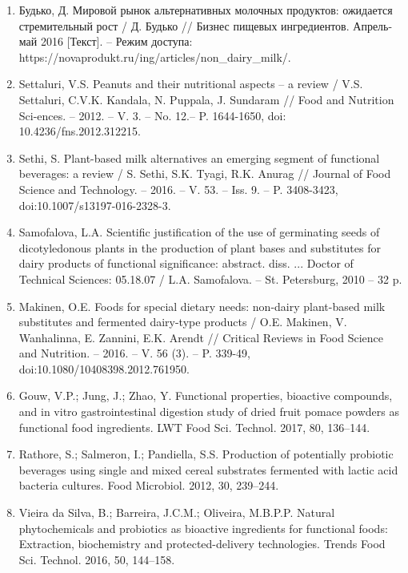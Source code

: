 \begin{enumerate}
\item
Будько, Д. Мировой рынок альтернативных молочных продуктов: ожидается
стремительный рост / Д. Будько // Бизнес пищевых ингредиентов.
Апрель-май 2016 {[}Текст{]}. -- Режим доступа:
https://novaprodukt.ru/ing/articles/non\_dairy\_milk/.

\item
Settaluri, V.S. Peanuts and their nutritional aspects -- a review /
V.S. Settaluri, C.V.K. Kandala, N. Puppala, J. Sundaram // Food and
Nutrition Sci-ences. -- 2012. -- V. 3. -- No. 12.-- P. 1644-1650, doi:
10.4236/fns.2012.312215.

\item
Sethi, S. Plant-based milk alternatives an emerging segment of
functional beverages: a review / S. Sethi, S.K. Tyagi, R.K. Anurag //
Journal of Food Science and Technology. -- 2016. -- V. 53. -- Iss. 9. --
P. 3408-3423, doi:10.1007/s13197-016-2328-3.

\item
Samofalova, L.A. Scientific justification of the use of germinating
seeds of dicotyledonous plants in the production of plant bases and
substitutes for dairy products of functional significance: abstract.
diss. ... Doctor of Technical Sciences: 05.18.07 / L.A. Samofalova. --
St. Petersburg, 2010 -- 32 p.

\item
Makinen, O.E. Foods for special dietary needs: non-dairy plant-based
milk substitutes and fermented dairy-type products / O.E. Makinen, V.
Wanhalinna, E. Zannini, E.K. Arendt // Critical Reviews in Food Science
and Nutrition. -- 2016. -- V. 56 (3). -- P. 339-49,
doi:10.1080/10408398.2012.761950.

\item
Gouw, V.P.; Jung, J.; Zhao, Y. Functional properties, bioactive
compounds, and in vitro gastrointestinal digestion study of dried fruit
pomace powders as functional food ingredients. LWT Food Sci. Technol.
2017, 80, 136--144.

\item
Rathore, S.; Salmeron, I.; Pandiella, S.S. Production of potentially
probiotic beverages using single and mixed cereal substrates fermented
with lactic acid bacteria cultures. Food Microbiol. 2012, 30, 239--244.

\item
Vieira da Silva, B.; Barreira, J.C.M.; Oliveira, M.B.P.P. Natural
phytochemicals and probiotics as bioactive ingredients for functional
foods: Extraction, biochemistry and protected-delivery technologies.
Trends Food Sci. Technol. 2016, 50, 144--158.


\end{enumerate}
